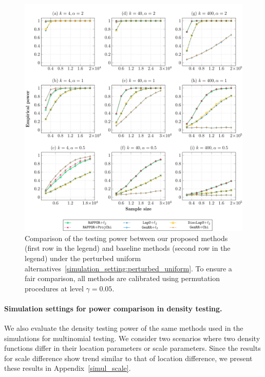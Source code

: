 \documentclass[twoside,11pt]{article}
\begin{document}
\begin{figure}[t!]
	\centering
	\includegraphics[width=0.95\linewidth]{perturbunif.pdf}
	\caption{
		Comparison of the testing power between our proposed methods (first row in the legend) and baseline methods (second row in the legend) under the perturbed uniform alternatives~\eqref{simulation_setting:perturbed_uniform}. To ensure a fair comparison, all methods are calibrated using permutation procedures at level $\gamma = 0.05$.
	}
	\label{fig:power_multinomial}
\end{figure}

\paragraph{Simulation settings for power comparison in density testing.}
We also evaluate the density testing power of the same methods used in the simulations for multinomial testing. We consider two scenarios where two density functions differ in their location parameters or scale parameters. Since the results for scale difference show trend similar to that of location difference, we present these results in Appendix~\ref{simul_scale}.
\end{document}

